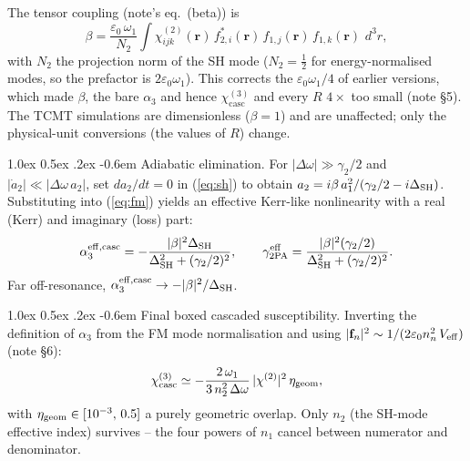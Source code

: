 \documentclass[11pt,a4paper]{article}
\makeatletter
\newcommand{\eps}{\varepsilon}
\newcommand{\bvec}[1]{\mathbf{#1}}
\newcommand{\f}{\bvec{f}}
\newcommand{\ri}{\bvec{r}}
\newcommand{\dthreer}{\,d^{3}r}
\newcommand{\chitwo}{\chi^{(2)}}
\newcommand{\chithree}{\chi^{(3)}}
\newcommand{\Dom}{\Delta\omega}
\newcommand{\DSH}{\Delta_{\rm SH}}
\newcommand{\effc}{{\rm eff,casc}}
\newcommand{\geom}{{\rm geom}}
\renewcommand\paragraph{%
  \@startsection{paragraph}{4}{\z@}%
                {1.0ex \@plus 0.5ex \@minus .2ex}%
                {-0.6em}%
                {\normalfont\itshape}}
\makeatother
\begin{document}
The tensor coupling (note's eq.~(beta)) is
\begin{equation}
  \beta = \frac{\eps_0\, \omega_1}{N_2} \int \chitwo_{ijk}(\ri)\,
            f_{2,i}^{*}(\ri)\, f_{1,j}(\ri)\, f_{1,k}(\ri)\,\dthreer,
  \label{eq:beta}
\end{equation}
with $N_2$ the projection norm of the SH mode ($N_2=\tfrac12$ for
energy-normalised modes, so the prefactor is $2\eps_0\omega_1$).  This
corrects the $\eps_0\omega_1/4$ of earlier versions, which made $\beta$,
the bare $\alpha_3$ and hence $\chithree_\text{casc}$ and every $R$
$4\times$ too small (note \S5).  The TCMT simulations are dimensionless
($\beta=1$) and are unaffected; only the physical-unit conversions
(the values of $R$) change.

\paragraph{Adiabatic elimination.}
For $|\Dom| \gg \gamma_2/2$ and $|\dot a_2| \ll |\Dom\, a_2|$, set
$da_2/dt = 0$ in (\ref{eq:sh}) to obtain
$a_2 = i\beta\, a_1^{2}/(\gamma_2/2 - i\DSH)$. Substituting into
(\ref{eq:fm}) yields an effective Kerr-like nonlinearity with a real
(Kerr) and imaginary (loss) part:
\begin{equation}
  \alpha_3^{\effc} = -\frac{|\beta|^2 \DSH}{\DSH^2 + (\gamma_2/2)^2},
  \qquad
  \gamma_{2{\rm PA}}^{\rm eff} = \frac{|\beta|^2 (\gamma_2/2)}{\DSH^2 + (\gamma_2/2)^2}.
  \label{eq:aeff}
\end{equation}
Far off-resonance, $\alpha_3^{\effc} \to -|\beta|^2/\DSH$.

\paragraph{Final boxed cascaded susceptibility.}
Inverting the definition of $\alpha_3$ from the FM mode normalisation
and using $|\f_n|^2 \sim 1/(2\eps_0 n_n^{2}\, V_{\rm eff})$ (note \S6):
\begin{equation}
  \chithree_{\rm casc} \simeq
       -\frac{2\,\omega_1}{3\, n_2^{2}\, \Dom}\, |\chitwo|^{2}\, \eta_\geom,
  \label{eq:chi3casc}
\end{equation}
with $\eta_\geom \in [10^{-3},\, 0.5]$ a purely geometric overlap.
Only $n_2$ (the SH-mode effective index) survives -- the four powers of
$n_1$ cancel between numerator and denominator.
\end{document}
